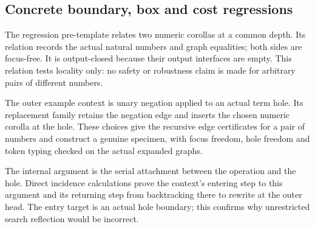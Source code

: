 
\subsection{Concrete boundary, box and cost regressions}

The regression pre-template relates two numeric corollas at a common
depth. Its relation records the actual natural numbers and graph equalities;
both sides are focus-free. It is output-closed because their output interfaces
are empty. This relation tests locality only: no safety or robustness claim
is made for arbitrary pairs of different numbers.




The outer example context is unary negation applied to an actual term
hole. Its replacement family retains the negation edge and inserts the
chosen numeric corolla at the hole. These choices give the recursive
edge certificates for a pair of numbers and construct a genuine specimen,
with focus freedom, hole freedom and token typing checked on the actual
expanded graphs.






The internal argument is the serial attachment between the operation
and the hole. Direct incidence calculations prove the context's entering
step to this argument and its returning step from backtracking there to
rewrite at the outer head. The entry target is an actual hole boundary;
this confirms why unrestricted search reflection would be incorrect.


